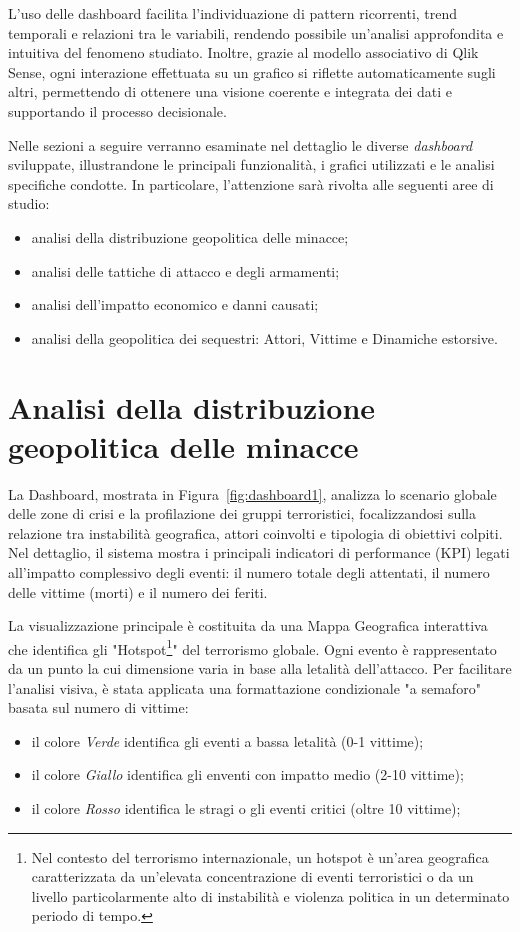 L’uso delle dashboard facilita l’individuazione di pattern ricorrenti, trend temporali e relazioni tra le variabili, rendendo possibile un’analisi approfondita e intuitiva del fenomeno studiato.  
Inoltre, grazie al modello associativo di Qlik Sense, ogni interazione effettuata su un grafico si riflette automaticamente sugli altri, permettendo di ottenere una visione coerente e integrata dei dati e supportando il processo decisionale.

Nelle sezioni a seguire verranno esaminate nel dettaglio le diverse \textit{dashboard} sviluppate, illustrandone le principali funzionalità, i grafici utilizzati e le analisi specifiche condotte.  
In particolare, l’attenzione sarà rivolta alle seguenti aree di studio:
\begin{itemize}
    \item analisi della distribuzione geopolitica delle minacce;
    \item analisi delle tattiche di attacco e degli armamenti;
    \item analisi dell'impatto economico e danni causati;
    \item analisi della geopolitica dei sequestri: Attori, Vittime e Dinamiche estorsive.
\end{itemize}

\section{Analisi della distribuzione geopolitica delle minacce}

La Dashboard, mostrata in Figura~\ref{fig:dashboard1}, analizza lo scenario globale delle zone di crisi e la profilazione dei gruppi terroristici, focalizzandosi sulla relazione tra instabilità geografica, attori coinvolti e tipologia di obiettivi colpiti. Nel dettaglio, il sistema mostra i principali indicatori di performance (KPI) legati all'impatto complessivo degli eventi: il numero totale degli attentati, il numero delle vittime (morti) e il numero dei feriti.

La visualizzazione principale è costituita da una Mappa Geografica interattiva che identifica gli "Hotspot\footnote{Nel contesto del terrorismo internazionale, un hotspot è un’area geografica caratterizzata da un’elevata concentrazione di eventi terroristici o da un livello particolarmente alto di instabilità e violenza politica in un determinato periodo di tempo.}"
 del terrorismo globale. Ogni evento è rappresentato da un punto la cui dimensione varia in base alla letalità dell'attacco. Per facilitare l'analisi visiva, è stata applicata una formattazione condizionale "a semaforo" basata sul numero di vittime:
\begin{itemize}
    \item il colore \textit{Verde} identifica gli eventi a bassa letalità (0-1 vittime);

    \item il colore \textit{Giallo} identifica gli enventi con impatto medio (2-10 vittime);

    \item il colore \textit{Rosso} identifica le stragi o gli eventi critici (oltre 10 vittime);
\end{itemize} 


